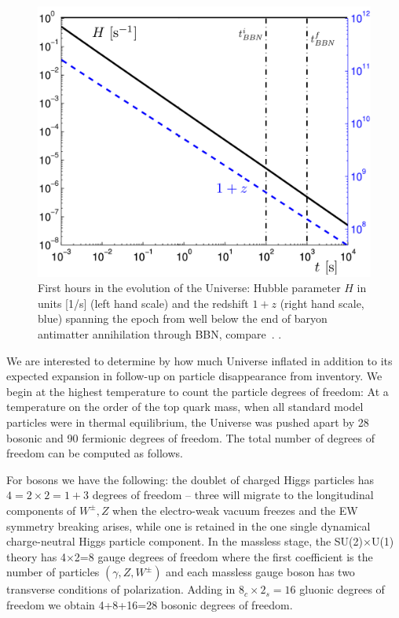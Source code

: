 \begin{figure}
\centerline{\includegraphics[width=0.90\linewidth]{plots/HzBBN.png}} 
\caption{First hours in the evolution of the Universe: Hubble parameter $H$ in units [1/s] (left hand scale) and the redshift $1+z$ (right hand scale, blue) spanning the epoch from well below the end of baryon antimatter annihilation through BBN, compare~. . } \label{fig:BBN1}
\end{figure}

We are interested to determine by how much Universe inflated in addition to its expected expansion in follow-up on particle disappearance from inventory. We begin at the highest temperature to count the particle degrees of freedom: At a temperature on the order of the top quark mass, when all standard model particles were in thermal equilibrium, the Universe was pushed apart by 28 bosonic and 90 fermionic degrees of freedom. The total number of degrees of freedom can be computed as follows. 

For bosons we have the following: the doublet of charged Higgs particles has $4=2\times2=1+3$ degrees of freedom -- three will migrate to the longitudinal components of $W^\pm, Z$ when the electro-weak vacuum freezes and the EW symmetry breaking arises, while one is retained in the one single dynamical charge-neutral Higgs particle component. In the massless stage, the SU(2)$\times$U(1) theory has 4$\times$2=8 gauge degrees of freedom where the first coefficient is the number of particles $(\gamma, Z, W^\pm)$ and each massless gauge boson has two transverse conditions of polarization. Adding in $8_c\times2_s=16$ gluonic degrees of freedom we obtain 4+8+16=28 bosonic degrees of freedom. 

